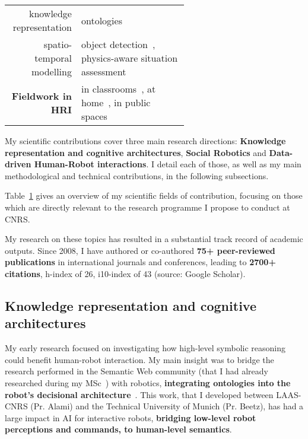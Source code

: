 \begin{table}[h!]
\begin{tabular}{rp{0.6\linewidth}}
        knowledge representation & \small
        ontologies~\cite{lemaignan2010oro, lemaignan2013explicit} \\
        spatio-temporal modelling & \small object
        detection~\cite{wallbridge2017qualitative}, physics-aware situation
        assessment\cite{lemaignan2018underworlds,sallami2019simulation} \\
        \midrule
        \textbf{Fieldwork in HRI} & \small in
        classrooms~\cite{hood2015when, lemaignan2016learning, jacq2016building,
        baxter2015wider,kennedy2016cautious,senft2018robots}, at
        home~\cite{mondada2015ranger}, in public spaces~\cite{winkle2020insitu}\\
        \bottomrule
    \end{tabular}
    \label{pi-expertise}
\end{table}



My scientific contributions cover three main research directions:
\textbf{Knowledge representation and cognitive architectures}, \textbf{Social
Robotics} and \textbf{Data-driven Human-Robot interactions}. I detail each of
those, as well as my main methodological and technical contributions, in the
following subsections.

Table~\ref{pi-expertise} gives an overview of my scientific fields of
contribution, focusing on those which are directly relevant to the research
programme I propose to conduct at CNRS.

My research on these topics has resulted in a substantial track record of
academic outputs.  Since 2008, I have authored or co-authored \textbf{75+
peer-reviewed publications} in international journals and conferences, leading
to \textbf{2700+ citations}, h-index of 26, i10-index of 43 (source: Google
Scholar).

\subsection{Knowledge representation and cognitive architectures}

My early research focused on investigating how high-level symbolic reasoning
could benefit human-robot interaction. My main insight was to bridge the
research performed in the Semantic Web community (that I had already researched
during my MSc~\cite{lemaignan2006mason}) with robotics, \textbf{integrating
ontologies into the robot's decisional
architecture}~\autocite[presented below]{lemaignan2010oro}. This work, that I
developed between LAAS-CNRS (Pr. Alami) and the Technical University of
Munich (Pr. Beetz), has had a large impact in AI for interactive robots,
\textbf{bridging low-level robot perceptions and commands, to human-level
semantics}.

